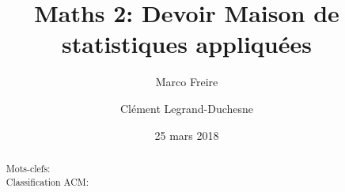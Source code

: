 \documentclass[a4paper,11pt]{article}%
\begin{document}
\title{Maths 2: Devoir Maison de statistiques appliquées}

\author{Marco Freire \and Clément Legrand-Duchesne}

\date{25 mars 2018}

\maketitle

\begin{abstract}
  
  \begin{description}
    
  \item[Mots-clefs:] 
      
  \item[Classification ACM:] 
  \end{description}
\end{abstract}

\renewcommand{\contentsname}{Plan}
\tableofcontents




\end{document}
